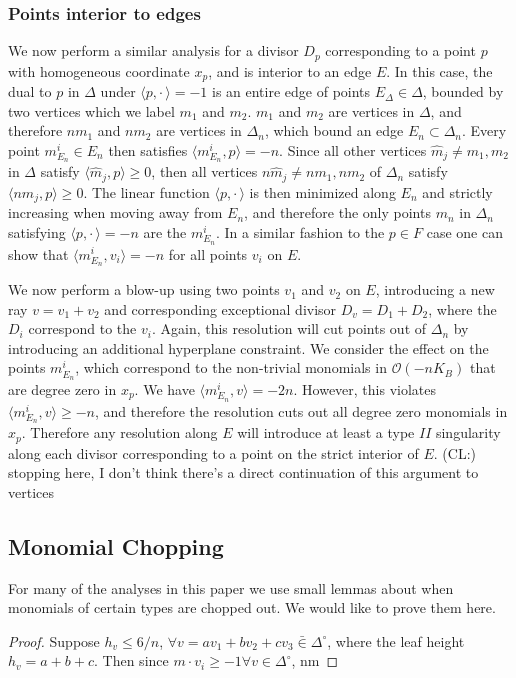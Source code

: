\documentclass[aps,prl,twocolumn, superscriptaddress,groupedaddress,nofootinbib]{revtex4}
\newcommand{\cl}[1]{{\color{red}(CL:) #1}}
\newcommand{\ina}{\bar\in}
\begin{document}
\subsubsection{Points interior to edges}
We now perform a similar analysis for a divisor $D_p$ corresponding to a point $p$ with homogeneous coordinate $x_p$, and is interior to an edge $E$. In this case, the dual to $p$ in $\Delta$ under $\langle p, \cdot \, \rangle = -1$ is an entire edge of points $E_\Delta \in \Delta$, bounded by two vertices which we label $m_1$ and $m_2$. $m_1$ and $m_2$ are vertices in $\Delta$, and therefore $n m_1$ and $n m_2$ are vertices in $\Delta_n$, which bound an edge $E_{n} \subset \Delta_n$. Every point $m^i_{E_n} \in E_{n}$ then satisfies $\langle m^i_{E_n} , p \rangle = -n$. Since all other vertices $\hat{m}_j \neq m_1, m_2$ in $\Delta$ satisfy $\langle \hat{m}_j, p\rangle \geq 0$, then all vertices $n \hat{m}_j \neq n m_1, n m_2$ of $\Delta_n$ satisfy $\langle n \hat{m}_j, p\rangle \geq 0$. The linear function $\langle p, \cdot \, \rangle$ is then minimized along $E_n$ and strictly increasing when moving away from $E_n$, and therefore the only points $m_n$ in $\Delta_n$ satisfying $ \langle p, \cdot \, \rangle = -n$ are the $m^i_{E_n}$. In a similar fashion to the $p \in F$ case one can show that $\langle m^i_{E_n}, v_i \rangle = -n$ for all points $v_i$ on $E$. 

We now perform a blow-up using two points $v_1$ and $v_2$ on $E$, introducing a new ray $v = v_1 + v_2$ and corresponding exceptional divisor $D_v = D_1 +D_2$, where the $D_i$ correspond to the $v_i$. Again, this resolution will cut points out of $\Delta_n$ by introducing an additional hyperplane constraint. We consider the effect on the points $m^i_{E_n}$, which correspond to the non-trivial monomials in $\mathcal{O}(-n K_B)$ that are degree zero in $x_p$. We have $\langle m^i_{E_n}, v \rangle = -2 n$. However, this violates $\langle m^i_{E_n}, v \rangle \geq -n$, and therefore the resolution cuts out all degree zero monomials in $x_p$. Therefore any resolution along $E$ will introduce at least a type $II$ singularity along each divisor corresponding to a point on the strict interior of $E$. \cl{stopping here, I don't think there's a direct continuation of this argument to vertices}

\subsection{Monomial Chopping}

For many of the analyses in this paper we use small
lemmas about when monomials of certain types are chopped out. We would 
like to prove them here.

\begin{proof}
Suppose $h_v \leq 6/n$, $\forall v=av_1+bv_2+cv_3 \ina \Delta^\circ$, where
the leaf height $h_v=a+b+c$. Then  since $m\cdot v_i\geq -1 \forall v\in \Delta^\circ$,
nm
\end{proof}


\end{document}
